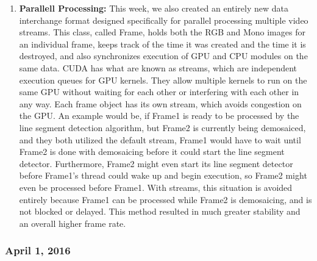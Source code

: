 \begin{enumerate}[leftmargin=2cm,labelindent=2cm]
\item \textbf{Parallell Processing:} 
This week, we also created an entirely new data interchange format designed specifically for parallel processing multiple video streams. This class, called Frame, holds both the RGB and Mono images for an individual frame, keeps track of the time it was created and the time it is destroyed, and also synchronizes execution of GPU and CPU modules on the same data. CUDA has what are known as streams, which are independent execution queues for GPU kernels. They allow multiple kernels to run on the same GPU without waiting for each other or interfering with each other in any way. Each frame object has its own stream, which avoids congestion on the GPU. An example would be, if Frame1 is ready to be processed by the line segment detection algorithm, but Frame2 is currently being demosaiced, and they both utilized the default stream, Frame1 would have to wait until Frame2 is done with demosaicing before it could start the line segment detector. Furthermore, Frame2 might even start its line segment detector before Frame1's thread could wake up and begin execution, so Frame2 might even be processed before Frame1. With streams, this situation is avoided entirely because Frame1 can be processed while Frame2 is demosaicing, and is not blocked or delayed. This method resulted in much greater stability and an overall higher frame rate.\\
\end{enumerate}

\subsubsection{April 1, 2016}
